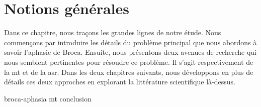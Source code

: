 \chapter{Notions générales}
\label{chap.general-notions}

Dans ce chapitre, nous traçons les grandes lignes de notre étude.
Nous commençons par introduire les détails du problème principal que nous abordons à savoir l'aphasie de Broca.
Ensuite, nous présentons deux avenues de recherche qui nous semblent pertinentes pour résoudre ce problème.
Il s'agit respectivement de la \gls{mt} et de la \gls{asr}.
Dans les deux chapitres suivants, 
nous développons en plus de détails ces deux approches
en explorant la littérature scientifique là-dessus.

{broca-aphasia}
{mt}
{conclusion}